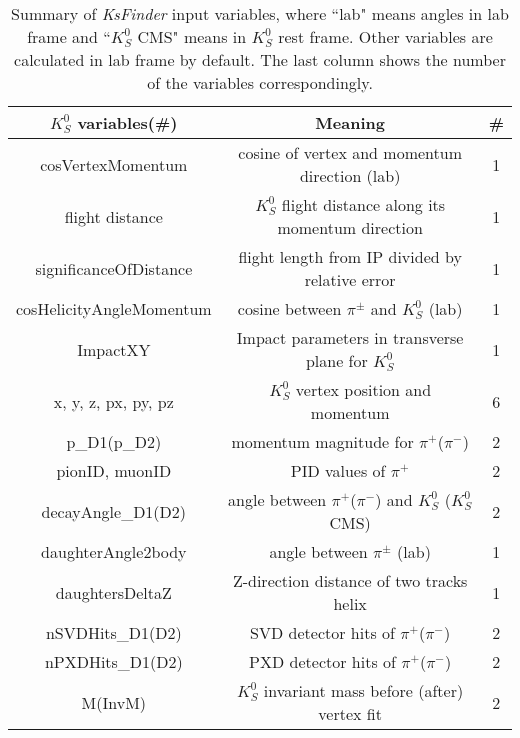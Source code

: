 \begin{table}[htbp]
	\centering 
	\small
	\caption{\small Summary of \textit{KsFinder} input variables, where ``lab" means angles in lab frame and  ``$K_S^0$ CMS" means in $K_S^0$ rest frame. Other variables are calculated in lab frame by default. The last column shows the number of the variables correspondingly.}
	\begin{tabular}{|c|c|c|} 
		\hline
		$K_S^0$ variables(\#) &  Meaning & \#\\
		\hline
		{cosVertexMomentum}  & cosine of vertex and momentum direction (lab) & 1\\
		flight distance& $K_S^0$ flight distance along its momentum direction & 1\\
		significanceOfDistance  & flight length from IP divided by relative error  & 1\\
		cosHelicityAngleMomentum & cosine between $\pi^{\pm}$ and $K_S^0$ (lab) & 1\\
		ImpactXY & Impact parameters in transverse plane for $K_S^0$ & 1\\
		x, y, z, px, py, pz& $K_S^0$ vertex position and momentum & 6\\
		p\_D1(p\_D2) & momentum magnitude for $\pi^+$($\pi^-$) & 2\\
		pionID, muonID & PID values of $\pi^+$ & 2\\
		decayAngle\_D1(D2)\footnotemark & angle between $\pi^+$($\pi^-$) and $K_S^0$ ($K_S^0$ CMS) & 2\\
		daughterAngle2body & angle between $\pi^{\pm}$ (lab) & 1\\
		daughtersDeltaZ & Z-direction distance of two tracks helix & 1\\
		nSVDHits\_D1(D2)& SVD detector hits of  $\pi^+$($\pi^-$) & 2\\
		nPXDHits\_D1(D2)& PXD detector hits of  $\pi^+$($\pi^-$) & 2\\
		M(InvM)& $K_S^0$ invariant mass before (after) vertex fit & 2\\
		\hline
	\end{tabular}
	\label{tab:ks_vars}
\end{table}

